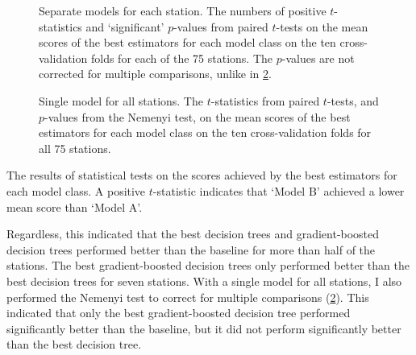 

\begin{table}
	\centering
	\begin{subfigure}{\textwidth}
		\centering
		
		\caption{
			Separate models for each station.
			The numbers of positive $t$-statistics and `significant' $p$-values from paired
			$t$-tests on the mean scores of the best estimators for each model class on the ten
			cross-validation folds for each of the 75 stations.
			The $p$-values are not corrected for multiple comparisons, unlike in
			\cref{sub-task-1:tab-t-tests-b}.
		}
		\label{sub-task-1:tab-t-tests-a}
	\end{subfigure}
	\subfigurespace
	\begin{subfigure}{\textwidth}
		\centering
		
		\caption{
			Single model for all stations.
			The $t$-statistics from paired $t$-tests, and $p$-values from the Nemenyi test, on the
			mean scores of the best estimators for each model class on the ten cross-validation
			folds for all 75 stations.
		}
		\label{sub-task-1:tab-t-tests-b}
	\end{subfigure}
	\caption{
		The results of statistical tests on the scores achieved by the best estimators for each model class.
		A positive $t$-statistic indicates that `Model B' achieved a lower mean score than
		`Model A'.
	}
	\label{sub-task-1:tab-t-tests}
\end{table}

Regardless, this indicated that the best decision trees and gradient-boosted decision
trees performed better than the baseline for more than half of the stations.
The best gradient-boosted decision trees only performed better than the best decision
trees for seven stations.
With a single model for all stations, I also performed the Nemenyi test to correct for
multiple comparisons (\cref{sub-task-1:tab-t-tests-b}).
This indicated that only the best gradient-boosted decision tree performed
significantly better than the baseline, but it did not perform significantly better
than the best decision tree.
